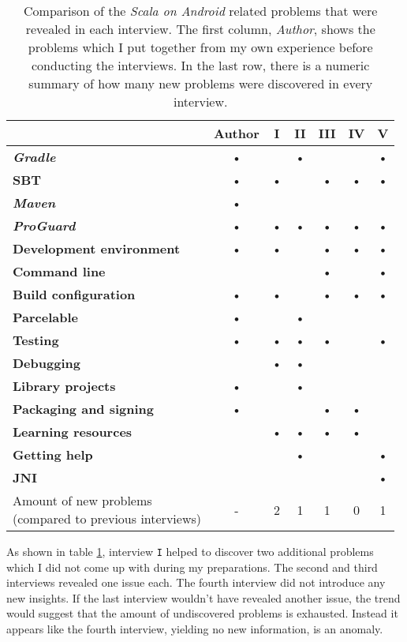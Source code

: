 \begin{table}[b]
	\begin{tabular}{|l|c|c|c|c|c|c|}\hline
		\diagbox{\textbf{Problem}}{\textbf{Interview}} & \textbf{Author} & \textbf{I} & \textbf{II} & \textbf{III} & \textbf{IV} & \textbf{V} \\ \hline
		\textbf{\textit{Gradle}}			& • &   & • &   &   & • \\ \hline
		\textbf{\ac{SBT}}					& • & • &   & • & • & • \\ \hline
		\textbf{\textit{Maven}}				& • &   &   &   &   &   \\ \hline
		\textbf{\textit{ProGuard}}			& • & • & • & • & • & • \\ \hline
		\textbf{Development environment}	& • & • &   & • & • & • \\ \hline
		\textbf{Command line}				&   &   &   & • &   & • \\ \hline
		\textbf{Build configuration}		& • & • &   & • & • & • \\ \hline
		\textbf{Parcelable}					& • &   & • &   &   &   \\ \hline
		\textbf{Testing}					& • & • & • & • &   & • \\ \hline
		\textbf{Debugging}					&   & • & • &   &   &   \\ \hline
		\textbf{Library projects}			& • &   & • &   &   &   \\ \hline
		\textbf{Packaging and signing}		& • &   &   & • & • &   \\ \hline
		\textbf{Learning resources}			&   & • & • & • & • &   \\ \hline
		\textbf{Getting help}				&   &   & • &   &   & • \\ \hline
		\textbf{JNI}						&   &   &   &   &   & • \\ \hline \hline
		\pbox{10cm}{Amount of new problems\\(compared to previous interviews)} & - & 2 & 1 & 1 & 0 & 1 \\ \hline
	\end{tabular}
	\caption{Comparison of the \textit{Scala on Android} related problems that were revealed in each interview. The first column, \textit{Author}, shows the problems which I put together from my own experience before conducting the interviews. In the last row, there is a numeric summary of how many new problems were discovered in every interview.}
	\label{interviews-comparison}
\end{table}

As shown in table \ref{interviews-comparison}, interview \texttt{I} helped to discover two additional problems which I did not come up with during my preparations. The second and third interviews revealed one issue each. The fourth interview did not introduce any new insights. If the last interview wouldn't have revealed another issue, the trend would suggest that the amount of undiscovered problems is exhausted. Instead it appears like the fourth interview, yielding no new information, is an anomaly.

